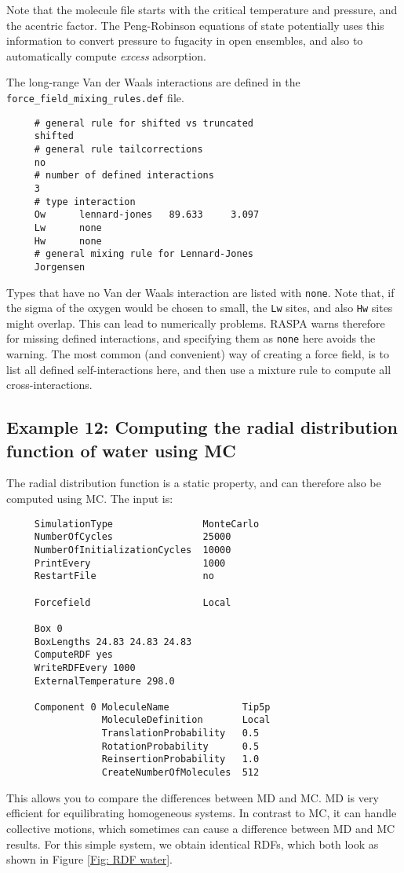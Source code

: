 Note that the molecule file starts with the critical temperature and pressure, and the acentric factor.
The Peng-Robinson equations of state potentially uses this information to convert pressure to fugacity in open ensembles,
and also to automatically compute \emph{excess }adsorption.

The long-range Van der Waals interactions are defined in the \verb+force_field_mixing_rules.def+ file.
\begin{tiny}
\begin{verbatim}
     # general rule for shifted vs truncated
     shifted
     # general rule tailcorrections
     no
     # number of defined interactions
     3
     # type interaction
     Ow      lennard-jones   89.633     3.097
     Lw      none
     Hw      none
     # general mixing rule for Lennard-Jones
     Jorgensen
\end{verbatim}
\end{tiny}
Types that have no Van der Waals interaction are listed with \verb+none+. Note that, if the sigma of the oxygen
would be chosen to small, the \verb+Lw+ sites, and also \verb+Hw+ sites might overlap.
This can lead to numerically problems. RASPA warns therefore for missing defined interactions, and specifying them as \verb+none+ here avoids the warning.
The most common (and convenient) way of creating a force field, is to list all defined self-interactions here, and then use a mixture rule to compute
all cross-interactions.


\subsection*{Example 12: Computing the radial distribution function of water using MC}

The radial distribution function is a static property, and can therefore also be computed using MC.
The input is:
\begin{tiny}
\begin{verbatim}
     SimulationType                MonteCarlo
     NumberOfCycles                25000
     NumberOfInitializationCycles  10000
     PrintEvery                    1000
     RestartFile                   no

     Forcefield                    Local

     Box 0
     BoxLengths 24.83 24.83 24.83
     ComputeRDF yes
     WriteRDFEvery 1000
     ExternalTemperature 298.0

     Component 0 MoleculeName             Tip5p
                 MoleculeDefinition       Local
                 TranslationProbability   0.5
                 RotationProbability      0.5
                 ReinsertionProbability   1.0
                 CreateNumberOfMolecules  512
\end{verbatim}
\end{tiny}
This allows you to compare the differences between MD and MC. MD is very efficient for equilibrating homogeneous systems.
In contrast to MC, it can handle collective motions, which sometimes can cause a difference between MD and MC results.
For this simple system, we obtain identical RDFs, which both look as shown in Figure \ref{Fig: RDF water}.

